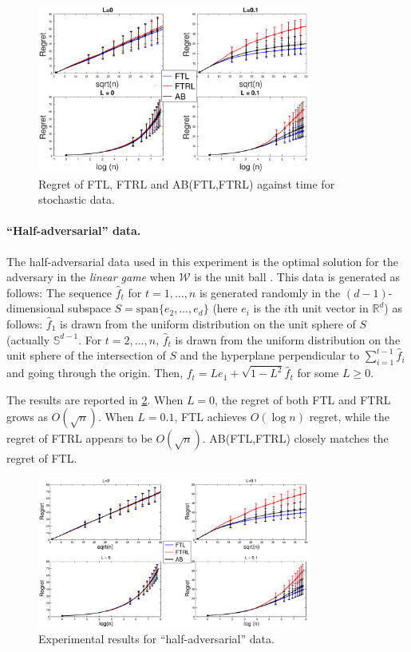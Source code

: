\documentclass[english]{article}
\newcommand{\cW}{\mathcal{W}}
\newcommand{\R}{\mathbb{R}}
\newcommand{\bS}{\mathbb{S}}
\begin{document}
\begin{figure}[th]
	\centering
	\includegraphics[width=0.8\textwidth]{figures/ExpResults/Stoc_normalized}
	\caption{Regret of FTL, FTRL and AB(FTL,FTRL) against time for stochastic data. \label{res:stoch}}
\end{figure}

\paragraph{``Half-adversarial'' data.}
The half-adversarial data used in this experiment is the optimal solution for the adversary 
in the \emph{linear game} when $\cW$ is the unit ball \citep{abernethy2008optimal}. 
This data is generated as follows:
The sequence $\hat{f}_t$ for $t = 1, \ldots, n$ is generated randomly
in the $(d-1)$-dimensional subspace $S = \text{span}\{e_2, \ldots, e_d\}$ (here $e_i$ is the $i$th unit vector in $\R^d$) as follows:
$\hat{f}_1$ is drawn from the uniform distribution on the unit sphere of $S$ (actually $\bS^{d-1}$. 
For $t = 2, \ldots, n$, $\hat{f}_t$ is drawn from the uniform distribution on the unit sphere
of the intersection of $S$ and the hyperplane perpendicular to $\sum_{i=1}^{t-1} \hat{f}_i$ and going through the origin.
Then, $f_t = Le_1 + \sqrt{1-L^2} \hat{f}_t$ for some $L \ge 0$.

The results are reported in \cref{res:adver}.
When $L=0$,  the regret of both FTL and FTRL grows as $O(\sqrt{n})$. 
When $L=0.1$, FTL achieves $O(\log n)$ regret,
while the regret of FTRL appears to be $O(\sqrt{n})$. 
AB(FTL,FTRL) closely matches the regret of FTL.

\begin{figure}[th]
	\centering
	\includegraphics[width=0.8\textwidth]{figures/ExpResults/Adve}
	\caption{Experimental results for ``half-adversarial'' data. \label{res:adver}}
\end{figure}
\end{document}
